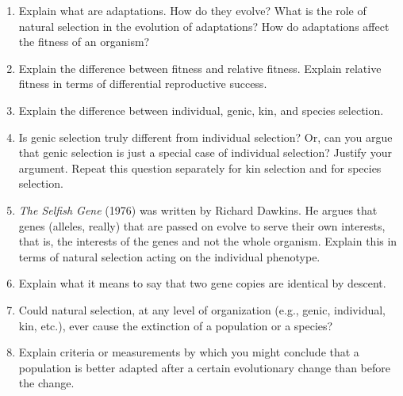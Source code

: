 \documentclass[letterpaper]{tufte-handout}
\begin{document}
\begin{enumerate}
	
	\item Explain what are adaptations. How do they evolve? What is the role of natural selection in the evolution of adaptations? How do adaptations affect the fitness of an organism?
	
	\item Explain the difference between fitness and relative fitness. Explain relative fitness in terms of differential reproductive success.
	
	\item Explain the difference between individual, genic, kin, and species selection.
	
	\item Is genic selection truly different from individual selection? Or, can you argue that genic selection is just a special case of individual selection? Justify your argument. Repeat this question separately for kin selection and for species selection.
	
	\item \textit{The Selfish Gene} (1976)  was written by Richard Dawkins. He argues that genes (alleles, really) that are passed on evolve to serve their own interests, that is, the interests of the genes and not the whole organism. Explain this in terms of natural selection acting on the individual phenotype.
	
	\item Explain what it means to say that two gene copies are identical by descent.
	
	\item Could natural selection, at any level of organization (e.g., genic, individual, kin, etc.), ever cause the extinction of a population or a species?
	
	\item Explain criteria or measurements by which you might conclude that a population is better adapted after a certain evolutionary change than before the change.
	
	
	
	
	
	
	
	

\end{enumerate}
\end{document}
